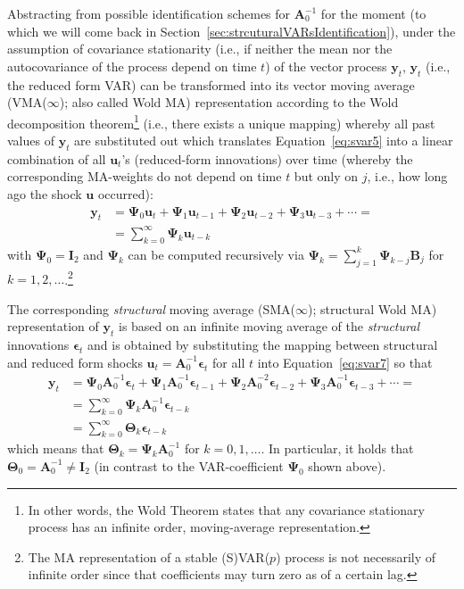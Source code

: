 \documentclass[a4paper,11pt,listof=nochaptergap,oneside,pointednumbers,bibtotoc,bigheadings,liststotoc,hidelinks]{scrbook}
\theoremstyle{mysatz}
\theoremstyle{mydefinition}
\theoremstyle{mytheorem}
\theoremstyle{mybemerkung}
\newcommand{\vect}[1]{\boldsymbol{\mathbf{#1}}}
\begin{document}
Abstracting from possible identification schemes for $\vect{A}_0^{-1}$ for the moment (to which we will come back in Section~\ref{sec:strcuturalVARsIdentification}), under the assumption of covariance stationarity (i.e., if neither the mean nor the autocovariance of the process depend on time $t$) of the vector process $\vect{y}_t$, $\vect{y}_t$ (i.e., the reduced form VAR) can be transformed into its vector moving average (VMA($\infty$); also called Wold MA) representation according to the Wold decomposition theorem\footnote{In other words, the Wold Theorem states that any covariance stationary process has an infinite order, moving-average representation.} (i.e., there exists a unique mapping) whereby all past values of $\vect{y}_t$ are substituted out which translates Equation~\ref{eq:svar5} into a linear combination of all $\vect{u}_t$'s (reduced-form innovations) over time (whereby the corresponding MA-weights do not depend on time $t$ but only on $j$, i.e., how long ago the shock $\vect{u}$ occurred):
\begin{equation} \label{eq:svar7}
\begin{split}
 			\vect{y}_t & = \vect{\Psi}_0\vect{u}_t + \vect{\Psi}_1\vect{u}_{t-1} + \vect{\Psi}_{2}\vect{u}_{t-2} + \vect{\Psi}_{3}\vect{u}_{t-3} + \cdots = \\
			& = \sum\limits_{k=0}^\infty \vect{\Psi}_k\vect{u}_{t-k}
\end{split}								
\end{equation}
with $\vect{\Psi}_0 =\vect{\mathbf{I}}_2$ and $\vect{\Psi}_k$ can be computed recursively via $\vect{\Psi}_k = \sum\limits_{j=1}^k \vect{\Psi}_{k-j}\vect{B}_j$ for $k=1, 2, \dots$.\footnote{The MA representation of a stable (S)VAR($p$) process is not necessarily of infinite order since that coefficients may turn zero as of a certain lag.}

The corresponding \textit{structural} moving average (SMA($\infty$); structural Wold MA) representation of $\vect{y}_t$ is based on an infinite moving average of the \textit{structural} innovations $\vect{\epsilon}_t$ and is obtained by substituting the mapping between structural and reduced form shocks $\vect{u}_t = \vect{A}_0^{-1}\vect{\epsilon}_t$ \citep{zivot:00} for all $t$ into Equation~\ref{eq:svar7} so that
\begin{equation} \label{eq:svar8}
\begin{split}
 			\vect{y}_t & = \vect{\Psi}_0\vect{A}_0^{-1}\vect{\epsilon}_t + \vect{\Psi}_1\vect{A}_0^{-1}\vect{\epsilon}_{t-1} + \vect{\Psi}_{2}\vect{A}_0^{-2}\vect{\epsilon}_{t-2} + \vect{\Psi}_{3}\vect{A}_0^{-1}\vect{\epsilon}_{t-3} + \cdots = \\
			& = \sum\limits_{k=0}^\infty \vect{\Psi}_k\vect{A}_0^{-1}\vect{\epsilon}_{t-k} \\
			& = \sum\limits_{k=0}^\infty \vect{\Theta}_k\vect{\epsilon}_{t-k}
\end{split}								
\end{equation}
which means that $\vect{\Theta}_k = \vect{\Psi}_k\vect{A}_0^{-1}$ for $k = 0, 1, \dots$. In particular, it holds that $\vect{\Theta}_0=\vect{A}_0^{-1} \neq \vect{I}_2$ (in contrast to the VAR-coefficient $\vect{\Psi}_0$ shown above).\\
\end{document}
